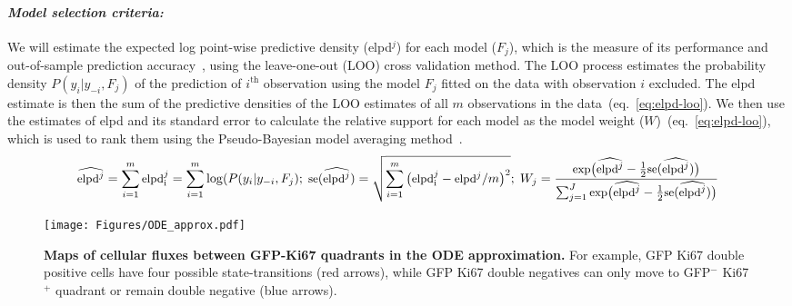 \documentclass[11pt]{article}
\newcommand{\para}[1]{\vspace*{-4.5mm}\paragraph{#1}}
\begin{document}
\para{\textit{Model selection criteria:}}
We will estimate the expected log point-wise predictive density (elpd$^{j}$) for each model ($F_{j}$), which is the measure of its performance and out-of-sample prediction accuracy~\citep{Vehtari:2016}, using the leave-one-out (LOO) cross validation method. 
The LOO process estimates the probability density $P(y_i | y_{-i}, F_j)$ of the prediction of $i^\text{th}$ observation using the model $F_j$ fitted on the data with observation $i$ excluded.
The elpd estimate is then the sum of the predictive densities of the LOO estimates of all $m$ observations in the data~(eq.~\ref{eq:elpd-loo}).
We then use the estimates of {elpd} and its standard error to calculate the relative support for each model as the model weight ($W$)~(eq.~\ref{eq:elpd-loo}), which is used to rank them using the Pseudo-Bayesian model averaging method~\citep{Yao:2018}.
\begin{equation} 
\small
\widehat{\text{elpd}^j} = \sum_{i=1}^m  \text{elpd}^j_\text{i}  = \sum_{i=1}^m \log(P(y_i | y_{-i}, F_j); \; 
\text{se}(\widehat{\text{elpd}^j})  = \sqrt{\sum_{i=1}^m  \big(\text{elpd}^j_\text{i} - \text{elpd}^j/m \big)^2 }; \;
W_j = \frac{\text{exp}\big(\widehat{\text{elpd}^j} - \frac{1}{2}\text{se}(\widehat{\text{elpd}^j})\big)}{\sum_{j=1}^J \text{exp}\big(\widehat{\text{elpd}^j} - \frac{1}{2}\text{se}(\widehat{\text{elpd}^j})\big)}
\label{eq:elpd-loo}
\end{equation}

\begin{wrapfigure}{r}{0.24\textwidth}
\centering
\vspace*{-4mm}
\texttt{[image: Figures/ODE\_approx.pdf]}
\vspace*{-7mm}
\caption{\textbf{Maps of cellular fluxes between GFP-Ki67 quadrants in the ODE approximation.} 
For example, GFP Ki67 double positive cells have four possible state-transitions (red arrows), while GFP Ki67 double negatives can only move to GFP$^-$ Ki67$^+$ quadrant or remain double negative (blue arrows).}
\vspace*{-5mm}
\label{fig:ode_approx}
\end{wrapfigure}
\end{document}
